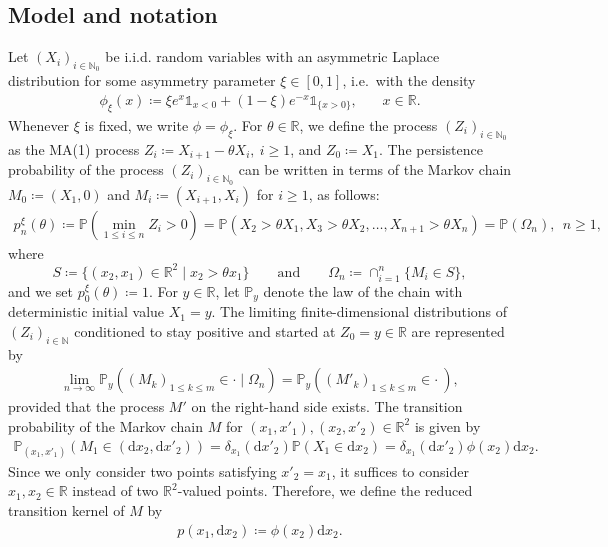 \documentclass[10pt,a4paper]{amsart}
\newcommand{\N}{\mathbb{N}} %
\newcommand{\R}{\mathbb{R}} %
\renewcommand{\P}{\mathbb{P}} %
\newcommand{\1}{\mathds{1}}
\renewcommand{\d}{\mathrm{d}}
\begin{document}
\subsection{Model and notation}
Let $(X_i)_{i\in\N_0}$ be i.i.d. random variables with an asymmetric Laplace distribution for some asymmetry parameter $\xi\in[0,1]$, i.e.\ with the density
\begin{align*}
   \phi_\xi( x)\coloneqq  \xi  e^x\mathds{1}_{x<0}+(1-\xi)e^{-x}\mathds{1}_{\{x>0\}},~~~~~~~~x\in\R.
\end{align*}
Whenever $\xi$ is fixed, we write $\phi=\phi_\xi$.
 For $\theta\in\R$, we define the process $(Z_i)_{i\in\N_0}$ as the MA(1) process
$Z_i\coloneqq X_{i+1}-\theta X_{i},~i\ge1$, and $Z_0\coloneqq X_1$.
The persistence probability of the process $(Z_i)_{i\in\N_0}$ can be written in terms of the Markov chain $M_0\coloneqq(X_1,0)$ and  $M_i\coloneqq(X_{i+1},X_i)$ for $i\geq 1$, as follows:
    \begin{align*}
   p_n^{\xi}(\theta)\coloneqq \P(\min_{1\leq i\leq n} Z_i> 0)=\P(X_2>\theta X_1,X_3>\theta X_2,\dots,X_{n+1}>\theta X_{n})=\P(\Omega_n),~~n\ge 1,
\end{align*}
where
$$
S\coloneqq \{(x_2,x_1)\in\R^2\mid x_2>\theta x_1\}\qquad\text{and}\qquad \Omega_n\coloneqq \cap_{i=1}^n\{M_i\in S\},
$$
and we set $p_0^{\xi}(\theta)\coloneqq1$. For $y\in\R$, let $\P_y$ denote the law of the chain with deterministic initial value $X_1=y$. The limiting finite-dimensional distributions of $(Z_i)_{i\in\N}$ conditioned to stay positive and started at $Z_0=y\in\R$ are represented by 
\begin{align}\label{def_lim_process}
    \lim_{n\to\infty}\P_y((M_k)_{1\leq k\leq m}\in\cdot\mid\Omega_n)=\P_y((M'_k)_{1\leq k\leq m}\in\cdot~),
\end{align}
provided that the process $M'$ on the right-hand side exists.
The transition probability of the Markov chain $M$ for $(x_1,x'_1),(x_2,x'_2)\in\R^2$ is given by
\begin{align*}
     \P_{(x_1,x'_1)}(M_1\in (\d x_2,\d x'_2))=\delta_{x_1}(\d x'_2)\P(X_1\in \d x_2)=\delta_{x_1}(\d x'_2)\phi(x_2)\d x_2.
\end{align*} 
Since we only consider two points satisfying $x'_2=x_1$, it suffices to consider $x_1, x_2\in \R$ instead of two $\R^2$-valued points. Therefore, we define the reduced transition kernel of $M$ by
   \begin{align*}
       p(x_1,\d x_2)\coloneqq \phi(x_2)\d x_2.
   \end{align*}
\end{document}
